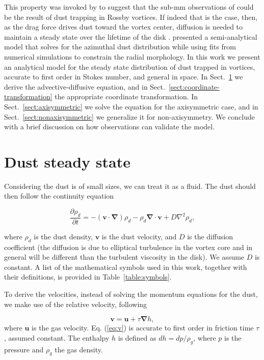 \documentclass[apj]{emulateapj}
\newcommand{\pderiv}[2]{\frac{\partial #1}{\partial #2}}
\renewcommand{\v}[1]{{\boldsymbol{#1}}} %
\newcommand{\del}{\v{\nabla}}
\newcommand{\grad}{\del}
\newcommand{\Div}{\del\cdot}
\newcommand{\Laplace}{\nabla^2}
\newcommand{\Eq}[1]{Eq. (\ref{#1})}
\newcommand{\eq}[1]{\Eq{#1}}
\newcommand{\sect}[1]{Sect.~\ref{#1}}
\newcommand{\beq}{\begin{equation}}
\newcommand{\eeq}{\end{equation}}
\begin{document}
This property was invoked by \citet{Regaly12} to suggest that the 
sub-mm observations of \citet{Brown09} could be the result of dust
trapping in Rossby vortices. If indeed that is the case, then, 
as the drag force drives dust toward the vortex center, diffusion is
needed to maintain a steady state over the lifetime of the disk
\citep{Klahr-Henning97,Chavanis00}. \citet{Birnstiel13} presented a semi-analytical model that solves for the azimuthal dust 
distribution while using fits from numerical simulations
\citep{Pinilla12b} to constrain the radial morphology. In this work we present an analytical 
model for the steady state distribution of dust trapped in vortices, 
accurate to first order in Stokes number, and general in space. In 
\sect{sect:model-equations} we derive the
advective-diffusive equation, and in \sect{sect:coordinate-transformation} the appropriate coordinate
transformation. In \sect{sect:axisymmetric} we solve the equation for the axisymmetric
case, and in \sect{sect:nonaxisymmetric} we generalize it for non-axisymmetry. We conclude
with a brief discussion on how observations can validate the model. 

\section{Dust steady state} 
\label{sect:model-equations}

Considering the dust is of small sizes, we can treat it as a
fluid. The dust should then follow the continuity equation 

\beq
  \pderiv{\rho_d}{t} = -(\v{v}\cdot\del)\rho_d - \rho_d \Div{\v{v}} + D\Laplace{\rho_d},
  \label{eq:continuity}
\eeq

\noindent where $\rho_d$ is the dust density, $\v{v}$ is the dust
velocity, and $D$ is the diffusion coefficient (the diffusion is due
to elliptical turbulence in the vortex core and in general will be
different than the turbulent viscosity in the disk). We assume $D$ is
constant. A list of the mathematical symbols used in this work, together
with their definitions, is provided in Table~\ref{table:symbols}. 

To derive the velocities, instead of solving the momentum equations
for the dust, we make use of the relative velocity, following
\citet[see also \citealt{Youdin08}]{Youdin-Goodman05}

\beq
\v{v} = \v{u} + \tau  \grad{h}, 
\label{eq:v}
\eeq
\noindent where $\v{u}$ is the gas velocity. \eq{eq:v} is 
accurate to first order in friction time $\tau$, assumed 
constant. The enthalpy $h$ is defined as $dh = dp /\rho_g$, where $p$ 
is the pressure and $\rho_g$ the gas density. 
\end{document}
